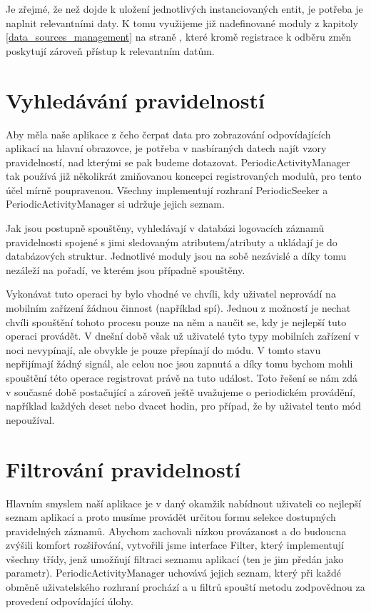\documentclass[thesis=M,czech]{FITthesis}[2012/06/26]
\begin{document}
Je zřejmé, že než dojde k uložení jednotlivých instanciovaných entit, je potřeba je naplnit relevantními daty. K tomu využijeme již nadefinované moduly z kapitoly \ref{data_sources_management} na straně \pageref{data_sources_management}, které kromě registrace k odběru změn poskytují zároveň přístup k relevantním datům.

\section{Vyhledávání pravidelností}
Aby měla naše aplikace z čeho čerpat data pro zobrazování odpovídajících aplikací na hlavní obrazovce, je potřeba v nasbíraných datech najít vzory pravidelností, nad kterými se pak budeme dotazovat. PeriodicActivityManager tak používá již několikrát zmiňovanou koncepci registrovaných modulů, pro tento účel mírně poupravenou. Všechny implementují rozhraní PeriodicSeeker a PeriodicActivityManager si udržuje jejich seznam.

Jak jsou postupně spouštěny, vyhledávají v databázi logovacích záznamů pravidelnosti spojené s jimi sledovaným atributem/atributy a ukládají je do databázových struktur. Jednotlivé moduly jsou na sobě nezávislé a díky tomu nezáleží na pořadí, ve kterém jsou případně spouštěny.

Vykonávat tuto operaci by bylo vhodné ve chvíli, kdy uživatel neprovádí na mobilním zařízení žádnou činnost (například spí). Jednou z možností je nechat chvíli spouštění tohoto procesu pouze na něm a naučit se, kdy je nejlepší tuto operaci provádět. V dnešní době však už uživatelé tyto typy mobilních zařízení v noci nevypínají, ale obvykle je pouze přepínají do  módu. V tomto stavu nepřijímají žádný signál, ale celou noc jsou zapnutá a díky tomu bychom mohli spouštění této operace registrovat právě na tuto událost. Toto řešení se nám zdá v současné době postačující a zároveň ještě uvažujeme o periodickém provádění, například každých deset nebo dvacet hodin, pro případ, že by uživatel tento mód nepoužíval.

\section{Filtrování pravidelností}
Hlavním smyslem naší aplikace je v daný okamžik nabídnout uživateli co nejlepší seznam aplikací a proto musíme provádět určitou formu selekce dostupných pravidelných záznamů. Abychom zachovali nízkou provázanost a do budoucna zvýšili komfort rozšiřování, vytvořili jsme interface Filter, který implementují všechny třídy, jenž umožňují filtraci seznamu aplikací (ten je jim předán jako parametr). PeriodicActivityManager uchovává jejich seznam, který při každé obměně uživatelského rozhraní prochází a u filtrů spouští metodu zodpovědnou za provedení odpovídající úlohy.
\end{document}

